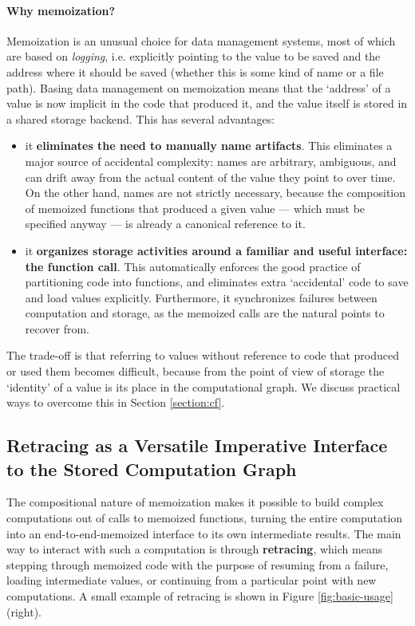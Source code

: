 \documentclass{article} %
\begin{document}
\paragraph{Why memoization?} Memoization is an unusual choice for data
management systems, most of which are based on \emph{logging}, i.e. explicitly
pointing to the value to be saved and the address where it should be saved
(whether this is some kind of name or a file path). Basing data management on
memoization means that the `address' of a value is now implicit in the code that
produced it, and the value itself is stored in a shared storage backend. This has several advantages:
\begin{itemize}
\item it \textbf{eliminates the need to manually name artifacts}. This
eliminates a major source of accidental complexity: names are arbitrary,
ambiguous, and can drift away from the actual content of the value they point to
over time. On the other hand, names are not strictly necessary, because the
composition of memoized functions that produced a given value --- which must be specified anyway --- is already a canonical reference to it.
\item it \textbf{organizes storage activities around a familiar and useful
interface: the function call}. This automatically enforces the good practice
of partitioning code into functions, and eliminates extra `accidental' code to
save and load values explicitly. Furthermore, it synchronizes failures between
computation and storage, as the memoized calls are the natural points to
recover from.
\end{itemize}

The trade-off is that referring to values without reference to code that
produced or used them becomes difficult, because from the point of view of
storage the `identity' of a value is its place in the computational graph. We
discuss practical ways to overcome this in Section \ref{section:cf}.

\subsection{Retracing as a Versatile Imperative Interface to the Stored Computation Graph}
\label{subsection:retracing}

The compositional nature of memoization makes it possible to build complex
computations out of calls to memoized functions, turning the entire computation
into an end-to-end-memoized interface to its own intermediate results. The main
way to interact with such a computation is through \textbf{retracing}, which
means stepping through memoized code with the purpose of resuming from a
failure, loading intermediate values, or continuing from a particular point with
new computations. A small example of retracing is shown in Figure
\ref{fig:basic-usage} (right). 
\end{document}
